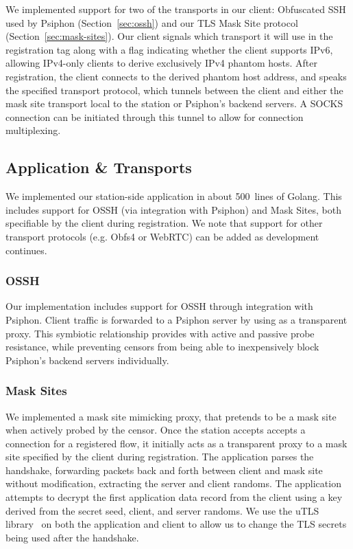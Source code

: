 \documentclass[sigconf]{acmart}
\begin{document}
We implemented support for two of the transports in our client: Obfuscated SSH used by
Psiphon (Section~\ref{sec:ossh}) and our TLS Mask Site protocol
(Section~\ref{sec:mask-sites}). Our client signals which transport it will use
in the registration tag along with a flag indicating whether the
client supports IPv6, allowing IPv4-only clients to derive exclusively IPv4 phantom hosts.
After registration, the client connects to the derived
phantom host address, and speaks the specified transport protocol, which
tunnels between the client and either the mask site transport local to the 
station or Psiphon's backend servers. A SOCKS connection can be initiated through
this tunnel to allow for connection multiplexing.


\subsection{Application \& Transports} 

We implemented our station-side application in about 500~lines of Golang. This includes
support for OSSH (via integration with Psiphon) and Mask Sites, both specifiable by the client
during registration. We note that support for other transport protocols (e.g. Obfs4 or WebRTC)
can be added as development continues. 

\subsubsection{OSSH}

Our \scheme implementation includes support for OSSH through integration with Psiphon. 
Client traffic is forwarded to a Psiphon server by using  \scheme as a  
transparent proxy. This symbiotic relationship provides \scheme with active 
and passive probe resistance, while preventing censors from being able to inexpensively
block Psiphon's backend servers individually. 


\subsubsection{Mask Sites}

We implemented a mask site mimicking proxy, that pretends to be a mask site
when actively probed by the censor. Once the station accepts accepts a connection 
for a registered flow, it initially acts as a transparent
proxy to a mask site specified by the client during registration. The
application parses the handshake, forwarding packets back and forth between
client and mask site without modification, extracting the server and client
randoms. The application attempts to decrypt the first application data record
from the client using a key derived from the secret seed, client, and server
randoms. We use the uTLS library~\cite{utls} on both the application and client
to allow us to change the TLS secrets being used after the handshake.
\end{document}

